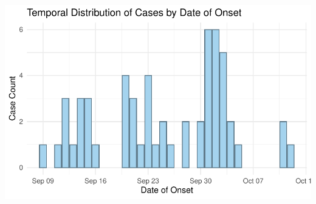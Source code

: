 \documentclass[
  letterpaper,
  DIV=11,
  numbers=noendperiod]{scrartcl}
\begin{document}
\includegraphics{Clean-Data-Work-in-Progress_files/figure-pdf/unnamed-chunk-7-1.pdf}
\end{document}
